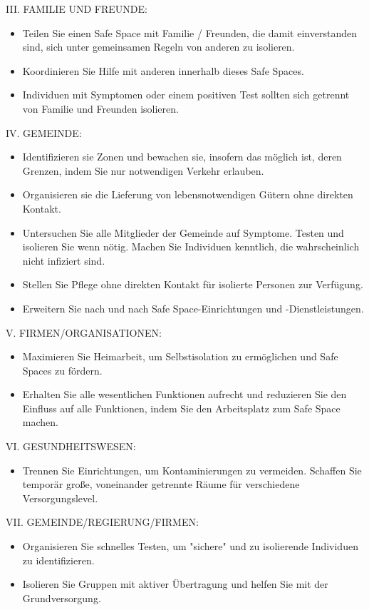 \documentclass{article}
\begin{document}
\begin{center}III. FAMILIE UND FREUNDE:\end{center}
\begin{itemize}
\item Teilen Sie einen Safe Space mit Familie / Freunden, die damit einverstanden sind, sich unter gemeinsamen Regeln von anderen zu isolieren.
\item Koordinieren Sie Hilfe mit anderen innerhalb dieses Safe Spaces.
\item Individuen mit Symptomen oder einem positiven Test sollten sich getrennt von Familie und Freunden isolieren.
\end{itemize}




\begin{center}IV. GEMEINDE:\end{center}
\begin{itemize}
\item Identifizieren sie Zonen und bewachen sie, insofern das möglich ist, deren Grenzen, indem Sie nur notwendigen Verkehr erlauben.
\item Organisieren sie die Lieferung von lebensnotwendigen Gütern ohne direkten Kontakt.
\item Untersuchen Sie alle Mitglieder der Gemeinde auf Symptome. Testen und isolieren Sie wenn nötig. Machen Sie Individuen kenntlich, die wahrscheinlich nicht infiziert sind.
\item Stellen Sie Pflege ohne direkten Kontakt für isolierte Personen zur Verfügung.
\item Erweitern Sie nach und nach Safe Space-Einrichtungen und -Dienstleistungen.
\end{itemize}




\begin{center}V. FIRMEN/ORGANISATIONEN:\end{center}
\begin{itemize}
\item Maximieren Sie Heimarbeit, um Selbstisolation zu ermöglichen und Safe Spaces zu fördern.
\item Erhalten Sie alle wesentlichen Funktionen aufrecht und reduzieren Sie den Einfluss auf alle Funktionen, indem Sie den Arbeitsplatz zum Safe Space machen.
\end{itemize}



\begin{center}VI. GESUNDHEITSWESEN:\end{center}
\begin{itemize}
\item Trennen Sie Einrichtungen, um Kontaminierungen zu vermeiden. Schaffen Sie temporär große, voneinander getrennte Räume für verschiedene Versorgungslevel.
\end{itemize}



\begin{center}VII. GEMEINDE/REGIERUNG/FIRMEN:\end{center}
\begin{itemize}
\item Organisieren Sie schnelles Testen, um "sichere" und zu isolierende Individuen zu identifizieren.
\item Isolieren Sie Gruppen mit aktiver Übertragung und helfen Sie mit der Grundversorgung.
\end{itemize}
\end{document}
